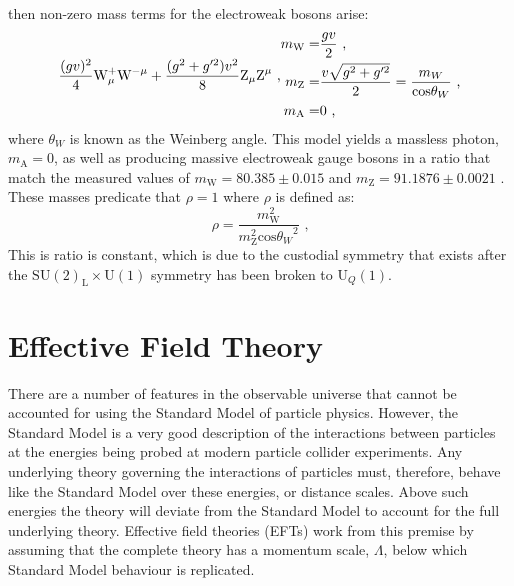 %
\noindent then non-zero mass terms for the electroweak bosons arise:
%
\begin{equation}
\frac{(gv)^{2}}{4} \text{W}^{+}_{\mu} \text{W}^{-\mu} + \frac{(g^{2} + g'^{2})v^{2}}{8} \text{Z}_{\mu} \text{Z}^{\mu} \text{ ,}\\
\begin{aligned}
m_{\text{W}} = & \frac{gv}{2} \text{ ,} \\
m_{\text{Z}} = & \frac{v\sqrt{g^{2} + g'^{2}}}{2} = \frac{m_{W}}{\text{cos}{\theta_{W}}} \text{ ,} \\
m_{\text{A}} = & 0 \text{ ,}
\end{aligned}
\end{equation}
%
\noindent where $\theta_{W}$ is known as the Weinberg angle.  This model yields a massless photon, $m_{\text{A}} = 0$, as well as producing massive electroweak gauge bosons in a ratio that match the measured values of $m_{\text{W}} = 80.385 \pm 0.015$ and $m_{\text{Z}} = 91.1876 \pm 0.0021$ \cite{Beringer:1900zz}.  These masses predicate that $\rho = 1$ where $\rho$ is defined as:
%
\begin{equation}
\rho = \frac{m_{\text{W}}^{2}}{m_{\text{Z}}^{2}\text{cos}{\theta_{W}}^{2}} \text{ ,}
\label{equ:custodialsymmetry}
\end{equation}
%
\noindent This is ratio is constant, which is due to the custodial symmetry that exists after the $\text{SU}(2)_{\text{L}} \times \text{U}(1)$ symmetry has been broken to $\text{U}_{Q}(1)$.


\section{Effective Field Theory}
There are a number of features in the observable universe that cannot be accounted for using the Standard Model of particle physics.  However, the Standard Model is a very good description of the interactions between particles at the energies being probed at modern particle collider experiments.  Any underlying theory governing the interactions of particles must, therefore, behave like the Standard Model over these energies, or distance scales.  Above such energies the theory will deviate from the Standard Model to account for the full underlying theory.  Effective field theories (EFTs) work from this premise by assuming that the complete theory  has a momentum scale, $\Lambda$, below which Standard Model behaviour is replicated.  

